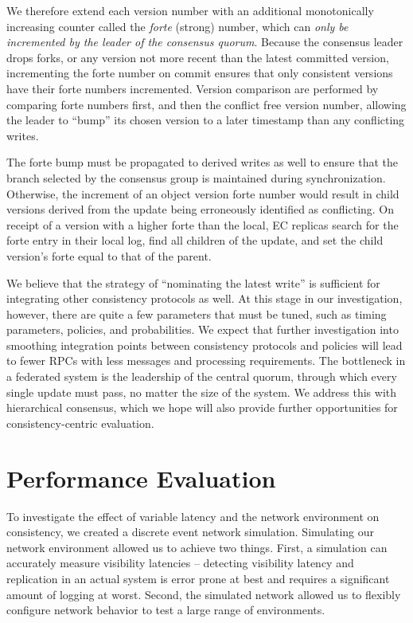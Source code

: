 We therefore extend each version number with an additional monotonically increasing counter called the \textit{forte} (strong) number, which can \emph{only be incremented by the leader of the consensus quorum}.
Because the consensus leader drops forks, or any version not more recent than the latest committed version, incrementing the forte number on commit ensures that only consistent versions have their forte numbers incremented.
Version comparison are performed by comparing forte numbers first, and then the conflict free version number, allowing the leader to ``bump'' its chosen version to a later timestamp than any conflicting writes.

The forte bump must be propagated to derived writes as well to ensure that the branch selected by the consensus group is maintained during synchronization.
Otherwise, the increment of an object version forte number would result in child versions derived from the update being erroneously identified as conflicting.
On receipt of a version with a higher forte than the local, EC replicas search for the forte entry in their local log, find all children of the update, and set the child version's forte equal to that of the parent.

We believe that the strategy of ``nominating the latest write'' is sufficient for integrating other consistency protocols as well.
At this stage in our investigation, however, there are quite a few parameters that must be tuned, such as timing parameters, policies, and probabilities.
We expect that further investigation into smoothing integration points between consistency protocols and policies will lead to fewer RPCs with less messages and processing requirements.
The bottleneck in a federated system is the leadership of the central quorum, through which every single update must pass, no matter the size of the system.
We address this with hierarchical consensus, which we hope will also provide further opportunities for consistency-centric evaluation.

\section{Performance Evaluation}
\label{ch04_evaluation}

To investigate the effect of variable latency and the network environment on consistency, we created a discrete event network simulation.
Simulating our network environment allowed us to achieve two things.
First, a simulation can accurately measure visibility latencies -- detecting visibility latency and replication in an actual system is error prone at best and requires a significant amount of logging at worst.
Second, the simulated network allowed us to flexibly configure network behavior to test a large range of environments.

